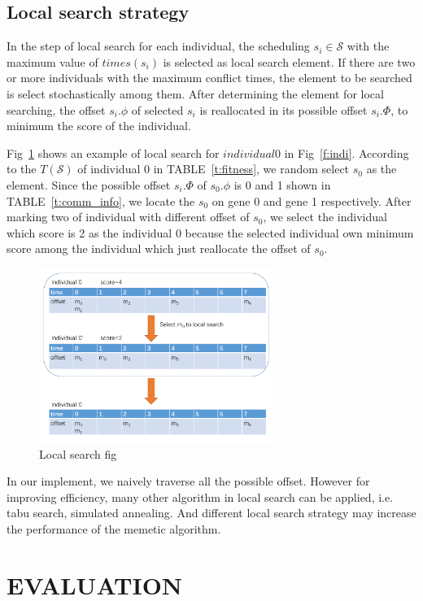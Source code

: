 \documentclass[journal]{IEEEtran}
\newcommand{\calS}{\mathcal{S}}
\begin{document}
\subsection{Local search strategy \label{s:loc}}

In the step of local search for each individual,
 the scheduling $s_i\in\calS$ with the maximum value of $times(s_i)$ is selected as local search element.
If there are two or more individuals with the maximum conflict times,
 the element to be searched is select stochastically among them.
After determining the element for local searching,
 the offset $s_i.\phi$ of selected $s_i$ is reallocated in its possible offset $s_i.\Phi$,
  to minimum the score of the individual.

Fig~\ref{f:local} shows an example of local search for $individual 0$ in Fig~\ref{f:indi}.
According to the $T(\calS)$ of individual 0 in TABLE~\ref{t:fitness},
 we random select $s_0$ as the element. 
Since the possible offset $s_i.\Phi$ of $s_0.\phi$ is 0 and 1 shown in TABLE~\ref{t:comm_info},
  we locate the $s_0$ on gene 0 and gene 1 respectively.
After marking two of individual with different offset of $s_0$,
 we select the individual which score is 2 as the individual 0 because the selected individual own minimum score among the individual which just reallocate the offset of $s_0$.
\begin{figure}[!t]
	\centering
	\includegraphics[width=3in]{picture/local.pdf}
	\caption{Local search fig}
	\label{f:local}
\end{figure}

In our implement,
 we naively traverse all the possible offset.
However for improving efficiency,
 many other algorithm in local search can be applied,
  i.e. tabu search, simulated annealing.
And different local search strategy may increase the performance of the memetic algorithm.

\section{EVALUATION\label{s:evalu}}
\end{document}
